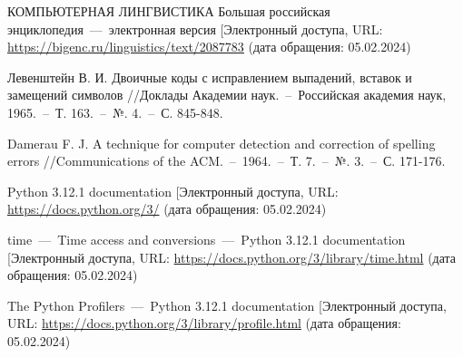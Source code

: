 \renewcommand\bibname{\centerline{СПИСОК ИСПОЛЬЗОВАННЫХ ИСТОЧНИКОВ}}

\begin{thebibliography}{3}
	\makeatletter
	\def\@biblabel#1{#1. }
	
	КОМПЬЮТЕРНАЯ ЛИНГВИСТИКА Большая российская энциклопедия~---~электронная версия [Электронный \text{ресурс].~---~Режим} доступа, URL: \url{https://bigenc.ru/linguistics/text/2087783} (дата обращения: 05.02.2024)
	
	Левенштейн В. И. Двоичные коды с исправлением выпадений, вставок и замещений символов //Доклады Академии наук.~–~Российская академия наук, 1965.~–~Т. 163.~–~№. 4.~–~С. 845-848.
	
	Damerau F. J. A technique for computer detection and correction of spelling errors //Communications of the ACM.~–~1964.~–~Т. 7.~–~№. 3.~–~С. 171-176.
	
	Python 3.12.1 documentation [Электронный \text{ресурс].~---~Режим} доступа, URL: \url{https://docs.python.org/3/} (дата обращения: 05.02.2024)

	time~—~Time access and conversions~—~Python 3.12.1 documentation [Электронный \text{ресурс].~---~Режим} доступа, URL: \url{https://docs.python.org/3/library/time.html} (дата обращения: 05.02.2024)
	
	The Python Profilers~—~Python 3.12.1 documentation [Электронный \text{ресурс].~---~Режим} доступа, URL: \url{https://docs.python.org/3/library/profile.html} (дата обращения: 05.02.2024)
\end{thebibliography}